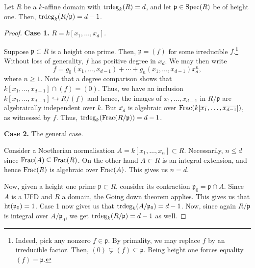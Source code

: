 \documentclass[12pt]{article}
\begin{document}
\begin{lem} 
	Let $R$ be a $k$-affine domain with $\operatorname{trdeg}_{k}(R) = d$, and let $\mathfrak{p} \in \operatorname{Spec}(R)$ be of height one. Then, $\operatorname{trdeg}_{k}(R/\mathfrak{p}) = d - 1$.
\end{lem}
\begin{proof} 
	\textbf{Case 1.} $R = k[x_{1}, \ldots, x_{d}]$.

	Suppose $\mathfrak{p} \subset R$ is a height one prime. Then, $\mathfrak{p} = (f)$ for some irreducible $f$.\footnote{Indeed, pick any nonzero $f \in \mathfrak{p}$. By primality, we may replace $f$ by an irreducible factor. Then, $(0) \subsetneq (f) \subseteq \mathfrak{p}$. Being height one forces equality $(f) = \mathfrak{p}$.} Without loss of generality, $f$ has positive degree in $x_{d}$. We may then write 
	\begin{equation*} 
	    f = g_{0}(x_{1}, \ldots, x_{d - 1}) + \cdots + g_{n}(x_{1}, \ldots, x_{d - 1}) x_{d}^{n},
	\end{equation*}
	where $n \ge 1$. \newline
	Note that a degree comparison shows that $k[x_{1}, \ldots, x_{d - 1}] \cap (f) = (0)$. \newline
	Thus, we have an inclusion $k[x_{1}, \ldots, x_{d - 1}] \hookrightarrow R/(f)$ and hence, the images of $x_{1}, \ldots, x_{d - 1}$ in $R/\mathfrak{p}$ are algebraically independent over $k$. But $\overline{x_{d}}$ is algebraic over $\operatorname{Frac}(k[\overline{x_{1}}, \ldots, \overline{x_{d - 1}}])$, as witnessed by $f$. \newline
	Thus, $\operatorname{trdeg}_{k}(\operatorname{Frac}(R/\mathfrak{p})) = d - 1$.

	\textbf{Case 2.} The general case.

	Consider a Noetherian normalisation $A = k[x_{1}, \ldots, x_{n}] \subset R$. Necessarily, $n \le d$ since $\operatorname{Frac}(A) \subseteq \operatorname{Frac}(R)$. On the other hand $A \subset R$ is an integral extension, and hence $\operatorname{Frac}(R)$ is algebraic over $\operatorname{Frac}(A)$. This gives us $n = d$.

	Now, given a height one prime $\mathfrak{p} \subset R$, consider its contraction $\mathfrak{p}_{0} = \mathfrak{p} \cap A$. Since $A$ is a UFD and $R$ a domain, the Going down theorem applies. This gives us that $\operatorname{ht}(\mathfrak{p}_{0}) = 1$. Case 1 now gives us that $\operatorname{trdeg}_{k}(A/\mathfrak{p}_{0}) = d - 1$. Now, since again $R/\mathfrak{p}$ is integral over $A/\mathfrak{p}_{0}$, we get $\operatorname{trdeg}_{k}(R/\mathfrak{p}) = d - 1$ as well.
\end{proof}
\end{document}
